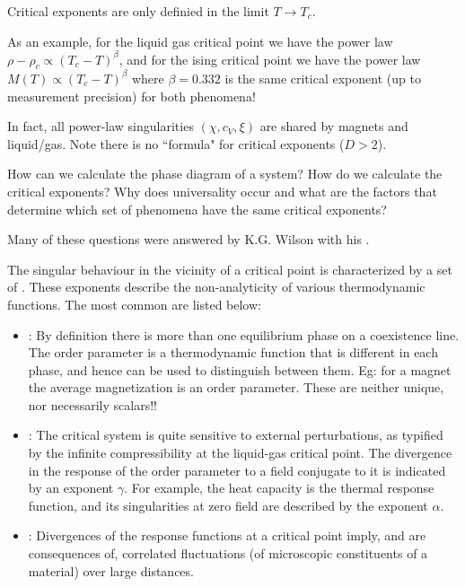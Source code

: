 \documentclass[12pt, a4paper, oneside, openright, titlepage]{book}
\begin{document}
\begin{note}
    Critical exponents are only definied in the limit $T\rightarrow T_c$.
\end{note}

As an example, for the liquid gas critical point we have the power law $\rho - \rho_c \propto (T_c - T)^{\beta}$, and for the ising critical point we have the power law $M(T) \propto (T_c - T)^{\beta}$ where $\beta = 0.332$ is the same critical exponent (up to measurement precision) for both phenomena!

In fact, all power-law singularities $(\chi, c_V, \xi)$ are shared by magnets and liquid/gas. Note there is no ``formula" for critical exponents ($D > 2$).

\begin{qst}
    How can we calculate the phase diagram of a system? How do we calculate the critical exponents? Why does universality occur and what are the factors that determine which set of phenomena have the same critical exponents?
\end{qst}

Many of these questions were answered by K.G. Wilson with his .

\begin{defn}
    The singular behaviour in the vicinity of a critical point is characterized by a set of . These exponents describe the non-analyticity of various thermodynamic functions. The most common are listed below: \begin{itemize}
        \item {}: By definition there is more than one equilibrium phase on a coexistence line. The order parameter is a thermodynamic function that is different in each phase, and hence can be used to distinguish between them. Eg: for a magnet the average magnetization is an order parameter. These are neither unique, nor necessarily scalars!!
        \item {}: The critical system is quite sensitive to external perturbations, as typified by the infinite compressibility at the liquid-gas critical point. The divergence in the response of the order parameter to a field conjugate to it is indicated by an exponent $\gamma$. For example, the heat capacity is the thermal response function, and its singularities at zero field are described by the exponent $\alpha$.
        \item {}: Divergences of the response functions at a critical point imply, and are consequences of, correlated fluctuations (of microscopic constituents of a material) over large distances.
    \end{itemize}
\end{defn}
\end{document}
